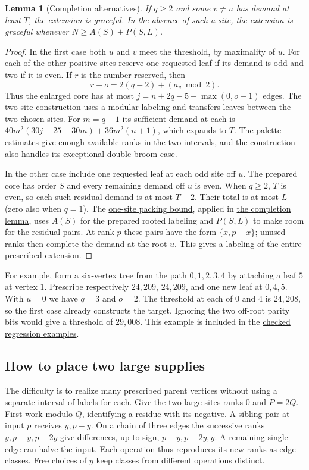 \documentclass[11pt]{article}
\newtheorem{lemma}[theorem]{Lemma}
\newcommand{\proofmodule}[2]{\href{https://github.com/Aky-lab/graceful-leaf-threshold-preprint/blob/v1.2/lean/Next/#1.lean}{#2}}
\begin{document}
\begin{lemma}[Completion alternatives]\label{routes}
If $q\ge2$ and some $v\ne u$ has demand at least $T$, the extension is graceful.
In the absence of such a site, the extension is graceful whenever
$N\ge A(S)+P(S,L)$.
\end{lemma}
\begin{proof}
In the first case both $u$ and $v$ meet the threshold, by maximality of $u$.
For each of the other positive sites reserve one requested leaf if its
demand is odd and two if it is even. If $r$ is the number reserved, then
\[
 r+o=2(q-2)+(a_v\bmod 2).
\]
Thus the enlarged core has at most $j=n+2q-5-\max(0,o-1)$ edges.
The \proofmodule{ParityPacketTwoBank}{two-site construction} uses a
modular labeling and transfers leaves between the two chosen sites.
For $m=q-1$ its sufficient demand at each is
$40m^2(30j+25-30m)+36m^2(n+1)$, which expands to $T$.
The \proofmodule{ParityPacketPalette}{palette estimates} give enough
available ranks in the two intervals, and the construction also handles
its exceptional double-broom case.

In the other case include one requested leaf at each odd site off $u$.
The prepared core has order $S$ and every remaining demand off $u$ is
even. When $q\ge2$, $T$ is even, so each such residual demand is at most
$T-2$. Their total is at most $L$ (zero also when $q=1$).
The \proofmodule{SparsePackingAssembly}{one-site packing bound}, applied in
\proofmodule{ParityPacketAssembly}{the completion lemma}, uses $A(S)$ for
the prepared rooted labeling and $P(S,L)$ to make room for the residual
pairs. At rank $p$ these pairs have the form $\{x,p-x\}$; unused ranks
then complete the demand at the root $u$. This gives a labeling of the
entire prescribed extension.
\end{proof}

For example, form a six-vertex tree from the path $0,1,2,3,4$ by attaching
a leaf $5$ at vertex $1$. Prescribe respectively $24{,}209$, $24{,}209$,
and one new leaf at $0,4,5$. With $u=0$ we have $q=3$ and $o=2$.
The threshold at each of $0$ and $4$ is $24{,}208$, so the first case
already constructs the target. Ignoring the two off-root parity bits
would give a threshold of $29{,}008$. This example is included in the
\proofmodule{ParityPacketRegression}{checked regression examples}.

\subsection{How to place two large supplies}
The difficulty is to realize many prescribed parent vertices without using
a separate interval of labels for each. Give the two large sites ranks
$0$ and $P=2Q$. First work modulo $Q$, identifying a residue with its
negative. A sibling pair at input $p$ receives $y,p-y$. On a chain of
three edges the successive ranks $y,p-y,p-2y$ give differences, up to
sign, $p-y,p-2y,y$. A remaining single edge can halve the input.
Each operation thus reproduces its new ranks as edge classes. Free
choices of $y$ keep classes from different operations distinct.
\end{document}
